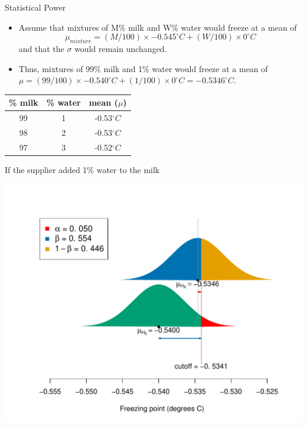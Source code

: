\documentclass[10pt]{beamer}\usepackage[]{graphicx}\usepackage[]{color}
\makeatletter
\def\maxwidth{ %
  \ifdim\Gin@nat@width>\linewidth
    \linewidth
  \else
    \Gin@nat@width
  \fi
}
\newenvironment{knitrout}{}{} %
\makeatother
\begin{document}
\begin{frame}{Statistical Power}
	\small
	\begin{itemize}
		\setlength\itemsep{1em}
		\item Assume that  mixtures of M\% milk and W\% water  would freeze at a mean of $$\mu_{mixture} =  (M/100) \times -0.545^{\circ}C + (W/100) \times 0 ^{\circ}C$$ and that the $\sigma$ would remain unchanged. \pause 
		\item Thus, mixtures of 99\% milk and 1\% water  would freeze at a mean of $\mu =  (99/100) \times -0.540^{\circ}C + (1/100) \times 0 ^{\circ}C = -0.5346 ^{\circ} C.$ 
	\end{itemize}
	
	\begin{center}
		\begin{tabular}{|c|c|c|}
			\hline 
			\% milk & \% water & mean ($\mu$) \\ 
			\hline 
			99 & 1 & -0.53$^{\circ}C$ \\ 
			98 & 2 & -0.53$^{\circ}C$ \\ 
			97 & 3 & -0.52$^{\circ}C$ \\ 
			\hline 
		\end{tabular} 
	\end{center}
\end{frame}


\begin{frame}[fragile]{If the supplier added 1\% water to the milk}
\begin{knitrout}\tiny
{}\color{fgcolor}

{\centering \includegraphics[width=\maxwidth]{figure/unnamed-chunk-7-1} 

}



\end{knitrout}
\end{frame}
\end{document}
